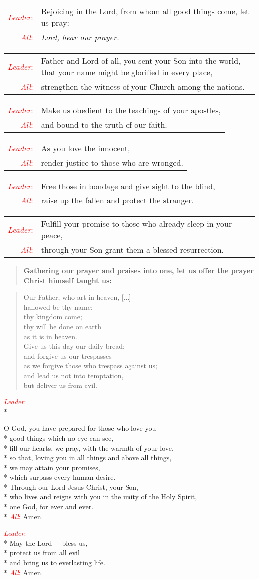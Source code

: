 \documentclass[letterpaper,14pt]{extarticle}
\newcommand{\side}[1]{\flagverse{\textcolor{red}{\textit{#1}}:}}
\newcommand{\sidestar}[1]{\textcolor{red}{\textit{#1}:}}
\newcommand{\rednote}[1]{\textcolor{red}{#1}}
\newlength{\oldindent}
\newcommand{\antiphon}[2]{
	\setlength{\oldindent}{\vindent}
	\setlength{\vindent}{0em}
	\begin{verse}
	\side{#1} \textbf{#2}
	\end{verse}
	\setlength{\vindent}{\oldindent}
}
\newcommand{\intercession}[2]{
	\begin{tabular}[h]{r p{4.25in}}
		\sidestar{Leader} & #1 \\
		\sidestar{All} & #2
	\end{tabular}}
\begin{document}
\intercession{Rejoicing in the Lord, from whom all good things come, let us pray:}
{\textit{Lord, hear our prayer.}}

\intercession{Father and Lord of all, you sent your Son into the world, that your name might be glorified in every place,}
{strengthen the witness of your Church among the nations.}

\intercession{Make us obedient to the teachings of your apostles,}
{and bound to the truth of our faith.}

\intercession{As you love the innocent,}
{render justice to those who are wronged.}

\intercession{Free those in bondage and give sight to the blind,}
{raise up the fallen and protect the stranger.}

\intercession{Fulfill your promise to those who already sleep in your peace,}
{through your Son grant them a blessed resurrection.}

\antiphon{Leader}{Gathering our prayer and praises into one, let us offer the
prayer Christ himself taught us:}
\begin{verse}
	\side{All} Our Father, who art in heaven, [...] \\
hallowed be thy name; \\
thy kingdom come; \\
thy will be done on earth \\
as it is in heaven. \\
Give us this day our daily bread; \\
and forgive us our trespasses \\
as we forgive those who trespass against us; \\
and lead us not into temptation, \\
but deliver us from evil.
\end{verse}

\sidestar{Leader}\\*

O God, you have prepared for those who love you \\*
good things which no eye can see, \\*
fill our hearts, we pray, with the warmth of your love, \\*
so that, loving you in all things and above all things, \\*
we may attain your promises, \\*
which surpass every human desire. \\*
Through our Lord Jesus Christ, your Son, \\*
who lives and reigns with you in the unity of the Holy Spirit, \\*
one God, for ever and ever. \\*
\sidestar{All} Amen.


\sidestar{Leader}\\*
May the Lord \rednote{+} bless us, \\*
protect us from all evil \\*
and bring us to everlasting life. \\*
\sidestar{All} Amen.
\end{document}
